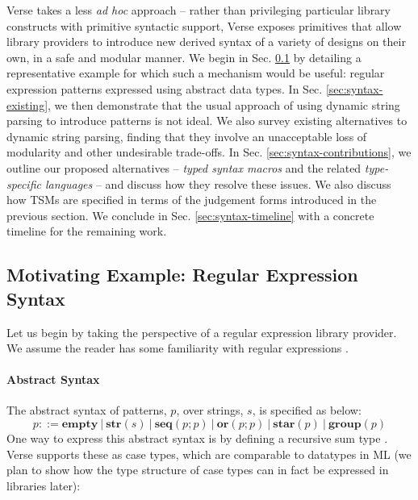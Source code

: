 Verse takes a less \emph{ad hoc} approach -- rather than privileging  particular library constructs with primitive syntactic support, Verse exposes primitives that allow library providers to introduce new derived syntax of a variety of designs on their own, in a safe and modular manner. %
We begin in Sec. \ref{sec:examples} by detailing a representative example for which such a mechanism would be useful: regular expression patterns expressed using abstract data types. In Sec. \ref{sec:syntax-existing}, we then demonstrate that the usual approach of using dynamic string parsing to introduce patterns is not ideal. We also survey existing alternatives to dynamic string parsing, finding that they involve an unacceptable loss of modularity and other undesirable trade-offs. In Sec. \ref{sec:syntax-contributions}, we outline our proposed alternatives -- \emph{typed syntax macros} and the related \emph{type-specific languages} -- and discuss how they resolve these issues. We also discuss how TSMs are specified in terms of the judgement forms introduced in the previous section. We conclude in Sec. \ref{sec:syntax-timeline} with a concrete timeline for the remaining work.



\subsection{Motivating Example: Regular Expression Syntax}\label{sec:examples}
Let us begin by taking the perspective of a regular expression library provider. We assume the reader has some familiarity with regular expressions \cite{Thompson:1968:PTR:363347.363387}. 

\paragraph{Abstract Syntax} The abstract syntax of {patterns}, $p$, over strings, $s$, is specified as below:\[p ::= \textbf{empty} ~|~ \textbf{str}(s) ~|~ \textbf{seq}(p; p) ~|~ \textbf{or}(p; p) ~|~ \textbf{star}(p) ~|~ \textbf{group}(p)\]
One way to express this abstract syntax is by defining a recursive sum type \cite{pfpl}. Verse supports these as case types, which are comparable to datatypes in ML (we plan to show how the type structure  of case types can in fact be expressed in libraries later):


